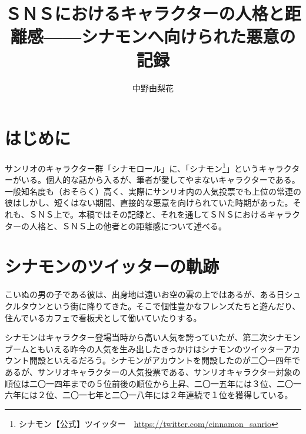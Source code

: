 \documentclass[b5j,twoside,twocolumn]{utarticle}
\title{ＳＮＳにおけるキャラクターの人格と距離感------シナモンへ向けられた悪意の記録}
\author{中野由梨花}
\date{\vspace{-5mm}}
\makeatletter
\def\yakuchu{%
\@ifnextchar[\@xfootnote %
{\stepcounter{yakuchu}%
\protected@xdef\@thefnmark{\theyakuchu}%
\@footnotemark\@footnotetext}}
\makeatother
\begin{document}
\maketitle

\setlength{\footskip}{-2mm}
\chead[]{}
\lfoot[]{\thepage{}}
\cfoot[]{}
\rfoot[\thepage{}]{}

\let\yakuchu=\endnote
\renewcommand{\footnoterule}{\noindent\rule{100mm}{0.3mm}\vskip2mm}
\thispagestyle{fancy}
\section*{はじめに}
サンリオのキャラクター群「シナモロール」に、「シナモン\footnote{シナモン【公式】ツイッター　\url{https://twitter.com/cinnamon_sanrio}}」というキャラクターがいる。個人的な話から入るが、筆者が愛してやまないキャラクターである。一般知名度も（おそらく）高く、実際にサンリオ内の人気投票でも上位の常連の彼はしかし、短くはない期間、直接的な悪意を向けられていた時期があった。それも、ＳＮＳ上で。本稿ではその記録と、それを通してＳＮＳにおけるキャラクターの人格と、ＳＮＳ上の他者との距離感について述べる。

\section*{シナモンのツイッターの軌跡}
こいぬの男の子である彼は、出身地は遠いお空の雲の上ではあるが、ある日シュクルタウンという街に降りてきた。そこで個性豊かなフレンズたちと遊んだり、住んでいるカフェで看板犬として働いていたりする。


シナモンはキャラクター登場当時から高い人気を誇っていたが、第二次シナモンブームともいえる昨今の人気を生み出したきっかけはシナモンのツイッターアカウント開設といえるだろう。シナモンがアカウントを開設したのが二〇一四年であるが、サンリオキャラクターの人気投票である、サンリオキャラクター対象の順位は二〇一四年までの５位前後の順位から上昇、二〇一五年には３位、二〇一六年には２位、二〇一七年と二〇一八年には２年連続で１位を獲得している。
\end{document}
